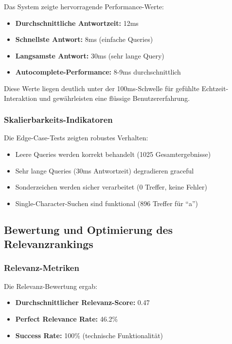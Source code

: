 Das System zeigte hervorragende Performance-Werte:
\begin{itemize}
    \item \textbf{Durchschnittliche Antwortzeit:} 12ms
    \item \textbf{Schnellste Antwort:} 8ms (einfache Queries)
    \item \textbf{Langsamste Antwort:} 30ms (sehr lange Query)
    \item \textbf{Autocomplete-Performance:} 8-9ms durchschnittlich
\end{itemize}

Diese Werte liegen deutlich unter der 100ms-Schwelle für gefühlte Echtzeit-Interaktion und gewährleisten eine flüssige Benutzererfahrung.

\subsubsection{Skalierbarkeits-Indikatoren}

Die Edge-Case-Tests zeigten robustes Verhalten:
\begin{itemize}
    \item Leere Queries werden korrekt behandelt (1025 Gesamtergebnisse)
    \item Sehr lange Queries (30ms Antwortzeit) degradieren graceful
    \item Sonderzeichen werden sicher verarbeitet (0 Treffer, keine Fehler)
    \item Single-Character-Suchen sind funktional (896 Treffer für "`a"')
\end{itemize}

\subsection{Bewertung und Optimierung des Relevanzrankings}

\subsubsection{Relevanz-Metriken}

Die Relevanz-Bewertung ergab:
\begin{itemize}
    \item \textbf{Durchschnittlicher Relevanz-Score:} 0.47
    \item \textbf{Perfect Relevance Rate:} 46.2\%
    \item \textbf{Success Rate:} 100\% (technische Funktionalität)
\end{itemize}

